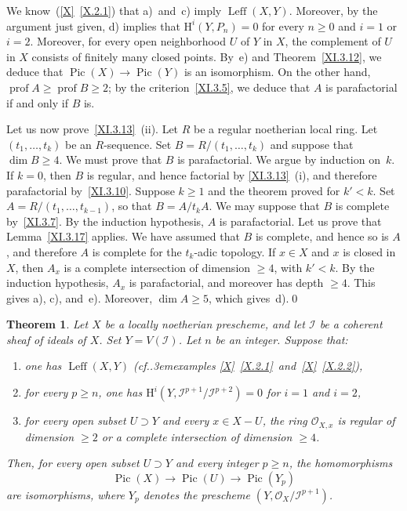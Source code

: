 \documentclass[11pt,a4paper,oneside]{book}
\providecommand{\sisi}[2]{#2}
\providecommand{\pageoriginale}{%
  \refstepcounter{pageoriginal}%
  \marginpar{\raggedright\footnotesize\bfseries\thepageoriginal}%
  \xspace}
\providecommand{\cf}{cf.\kern.3em}
\providecommand{\Ii}{\mathcal I}
\providecommand{\OX}{\mathcal O_X}
\providecommand{\OXx}{\mathcal O_{X,x}}
\providecommand{\Pic}{\operatorname{Pic}}
\providecommand{\prof}{\operatorname{prof}}
\renewcommand{\H}{\mathrm H}
\providecommand{\Leff}{\operatorname{Leff}}
\newenvironment{enumeratei}
  {\begin{enumerate}[label=(\roman*)]}
  {\end{enumerate}}
\theoremstyle{plain}
\newtheorem{theoreme}[subsection]{Theorem}
\theoremstyle{definition}
\theoremstyle{remark}
\renewcommand{\Ref}[1]{\textup{\ref{#1}}}
\begin{document}
\enlargethispage{5mm}%
We know~(\Ref{X}~\Ref{X.2.1}) that a)~and~c) imply $\Leff(X, Y)$. Moreover, by the argument just given, d) implies that $\H^i(Y, P_n)=0$ for every $n\geq 0$ and $i=1$ or $i=2$. Moreover, for every open neighborhood $U$ of $Y$ in $X$, the complement of $U$ in $X$ consists of finitely many closed points. By~e) and Theorem~\Ref{XI.3.12}, we deduce that $\Pic(X)\to \Pic(Y)$ is an isomorphism. On the other hand, $\prof A\geq \prof B\geq 2$; by the criterion~\Ref{XI.3.5}, we deduce\pageoriginale that $A$ is parafactorial if and only if $B$ is.

Let us now prove~\Ref{XI.3.13}~(ii). Let $R$ be a regular noetherian local ring. Let $(t_1, \ldots, t_k)$ be an $R$-sequence. Set $B=R/(t_1, \ldots, t_k)$ and suppose that $\dim B\geq 4$. We must prove that $B$ is parafactorial. We argue by induction on~$k$. If $k=0$, then $B$ is regular, and hence factorial by \Ref{XI.3.13}~(i), and therefore parafactorial by~\Ref{XI.3.10}. Suppose $k\geq 1$ and the theorem proved for $k'<k$. Set $A=R/(t_1, \ldots, t_{k-1})$, so that $B=A/t_k A$. We may suppose that $B$ is complete by~\Ref{XI.3.7}. By the induction hypothesis, $A$ is parafactorial. Let us prove that Lemma~\Ref{XI.3.17} applies. We have assumed that $B$ is complete, and hence so is $A$, and therefore $A$ is complete for the $t_k$-adic topology. If $x\in X$ and $x$ is closed in $X$, then $A_x$ is a complete intersection of dimension $\geq 4$, with $k'<k$. By the induction hypothesis, $A_x$ is parafactorial, and moreover has depth $\geq 4$. This gives a), c), and~e). Moreover, $\dim A\geq 5$, which gives~d).\qed

\begin{theoreme} \label{XI.3.18}
Let $X$ be a locally noetherian prescheme, and let $\Ii$ be a coherent sheaf of ideals of $X$. Set $Y=V(\Ii)$. Let $n$ be an integer. Suppose that:
\begin{enumeratei}
\item
one has $\sisi{\leff}{\Leff}(X, Y)$ (\cf examples \Ref{X}~\Ref{X.2.1}~and~\Ref{X}~\Ref{X.2.2}),
\item
for every $p\geq n$, one has $\H^i(Y, \Ii^{p+1}/\Ii^{p+2})=0$ for $i=1$ and $i=2$,
\item
for every open subset $U\supset Y$ and every $x\in X-U$, the ring $\OXx$ is regular of dimension $\geq 2$ or a complete intersection of dimension $\geq 4$.
\end{enumeratei}
\noindent
Then, for every open subset $U\supset Y$ and every integer $p\geq n$, the homomorphisms
\[
\Pic(X)\to\Pic(U)\to\Pic(Y_p)
\]
are isomorphisms, where $Y_p$ denotes the prescheme $(Y, \OX/\Ii^{p+1})$.
\end{theoreme}
\end{document}

